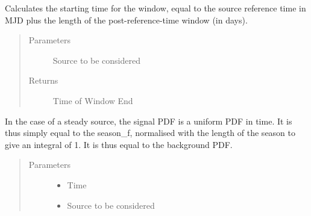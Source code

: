 \documentclass[letterpaper,10pt,english]{sphinxmanual}
\begin{document}
\begin{fulllineitems}
\begin{fulllineitems}
\end{fulllineitems}


\begin{fulllineitems}
\label{\detokenize{index:flarestack.core.time_pdf.Steady.sig_t1}}
Calculates the starting time for the window, equal to the
source reference time in MJD plus the length of the post-reference-time
window (in days).
\begin{quote}\begin{description}
\item[{Parameters}] \leavevmode
{} \textendash{} Source to be considered

\item[{Returns}] \leavevmode
Time of Window End

\end{description}\end{quote}

\end{fulllineitems}


\begin{fulllineitems}
\label{\detokenize{index:flarestack.core.time_pdf.Steady.signal_f}}
In the case of a steady source, the signal PDF is a uniform PDF in
time. It is thus simply equal to the season\_f, normalised with the
length of the season to give an integral of 1. It is thus equal to
the background PDF.
\begin{quote}\begin{description}
\item[{Parameters}] \leavevmode\begin{itemize}
\item {} 
 \textendash{} Time

\item {} 
 \textendash{} Source to be considered

\end{itemize}


\end{description}
\end{quote}
\end{fulllineitems}
\end{fulllineitems}
\end{document}
